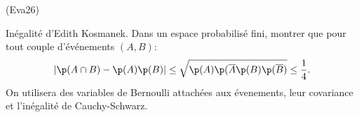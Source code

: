 \begin{tiny}(Eva26)\end{tiny} Inégalité d'Edith Kosmanek.\newline
Dans un espace probabilisé fini, montrer que pour tout couple d'événements $(A,B)$:
\[
 \left|\p(A\cap B) - \p(A)\p(B)\right| 
 \leq \sqrt{\p(A) \p(\overline{A} \p(B) \p(\overline{B})} \leq \frac{1}{4}.
\]
On utilisera des variables de Bernoulli attachées aux évenements, leur covariance et l'inégalité de Cauchy-Schwarz.